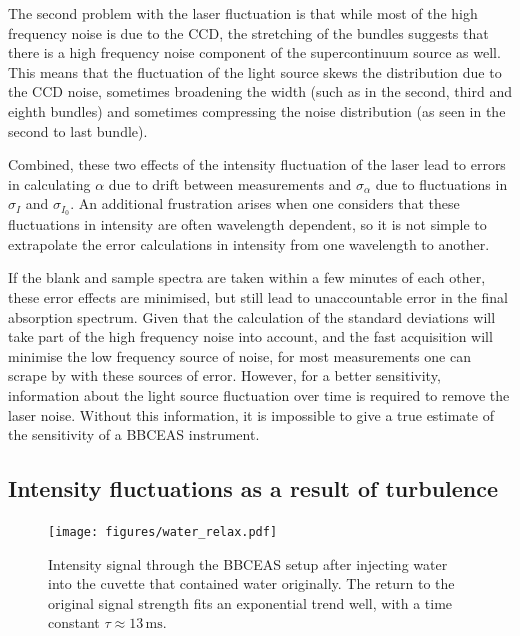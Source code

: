 The second problem with the laser fluctuation is that while most of the high
frequency noise is due to the \ac{CCD}, the stretching of the bundles suggests
that there is a high frequency noise component of the supercontinuum source as
well. This means that the fluctuation of the light source skews the
distribution due to the \ac{CCD} noise, sometimes broadening the width (such as
in the second, third and eighth bundles) and sometimes compressing the noise
distribution (as seen in the second to last bundle).

Combined, these two effects of the intensity fluctuation of the laser lead to
errors in calculating $\alpha$ due to drift between measurements and
$\sigma_{\alpha}$ due to fluctuations in $\sigma_{I}$ and $\sigma_{I_0}$. An
additional frustration arises when one considers that these fluctuations in
intensity are often wavelength dependent, so it is not simple to extrapolate
the error calculations in intensity from one wavelength to another.

If the blank and sample spectra are taken within a few minutes of each other,
these error effects are minimised, but still lead to unaccountable error in the
final absorption spectrum. Given that the calculation of the standard
deviations will take part of the high frequency noise into account, and the
fast acquisition will minimise the low frequency source of noise, for most
measurements one can scrape by with these sources of error. However, for a
better sensitivity, information about the light source fluctuation over time is
required to remove the laser noise. Without this information, it is impossible
to give a true estimate of the sensitivity of a \ac{BBCEAS} instrument.

\subsection{Intensity fluctuations as a result of turbulence}

\begin{figure}
\begin{center}
\texttt{[image: figures/water\_relax.pdf]}
\end{center}
\caption{Intensity signal through the \ac{BBCEAS} setup after injecting water into the cuvette that contained water originally. The return to the original signal strength fits an exponential trend well, with a time constant $\tau \approx 13\,\text{ms}$.}
\label{fig:relax}
\end{figure}


